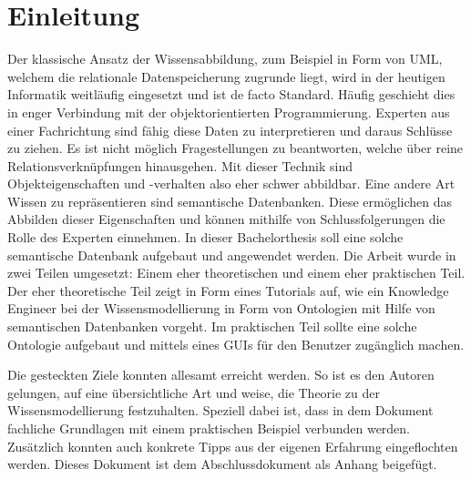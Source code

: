 \chapter{Einleitung}
\label{chap:einleitung}


Der klassische Ansatz der Wissensabbildung, zum Beispiel in Form von UML, welchem die relationale Datenspeicherung zugrunde liegt, wird in der heutigen Informatik weitläufig eingesetzt und ist de facto Standard. Häufig geschieht dies in enger Verbindung mit der objektorientierten Programmierung. Experten aus einer Fachrichtung sind fähig diese Daten zu interpretieren und daraus Schlüsse zu ziehen. Es ist nicht möglich Fragestellungen zu beantworten, welche über reine Relationsverknüpfungen hinausgehen. Mit dieser Technik sind Objekteigenschaften und -verhalten also eher schwer abbildbar. Eine andere Art Wissen zu repräsentieren sind semantische Datenbanken. Diese ermöglichen das Abbilden dieser Eigenschaften und können mithilfe von Schlussfolgerungen die Rolle des Experten einnehmen. 
In dieser Bachelorthesis soll eine solche semantische Datenbank aufgebaut und angewendet werden.  Die Arbeit wurde in zwei Teilen umgesetzt: Einem eher theoretischen und einem eher praktischen Teil. Der eher theoretische Teil zeigt in Form eines Tutorials auf, wie ein Knowledge Engineer bei der Wissensmodellierung in Form von Ontologien mit Hilfe von semantischen Datenbanken vorgeht. Im praktischen Teil sollte eine solche Ontologie aufgebaut und mittels eines GUIs für den Benutzer zugänglich machen.

Die gesteckten Ziele konnten allesamt erreicht werden. So ist es den Autoren gelungen, auf eine übersichtliche Art und weise, die Theorie zu der Wissensmodellierung festzuhalten. Speziell dabei ist, dass in dem Dokument fachliche Grundlagen mit einem praktischen Beispiel verbunden werden. Zusätzlich konnten auch konkrete Tipps aus der eigenen Erfahrung eingeflochten werden. Dieses Dokument ist dem Abschlussdokument als Anhang beigefügt. 

